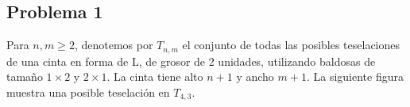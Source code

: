 \subsection*{Problema 1}
Para \(n,m\ge2\), denotemos por \(T_{n,m}\) el conjunto de todas las posibles teselaciones de una cinta en forma de L, de grosor de 2 unidades, utilizando baldosas de tamaño \(1\times2\) y \(2\times1\). La cinta tiene alto \(n+1\) y ancho \(m+1\). La siguiente figura muestra una posible teselación en \(T_{4,3}\).